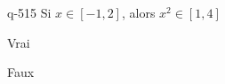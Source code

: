 \begin{truefalse}{q-515}
Si $x\in [-1,2]$, alors $x^2\in [1,4]$
\item Vrai
\item* Faux
\end{truefalse}

